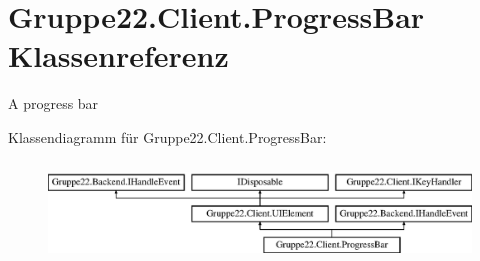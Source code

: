 \hypertarget{class_gruppe22_1_1_client_1_1_progress_bar}{\section{Gruppe22.\-Client.\-Progress\-Bar Klassenreferenz}
\label{class_gruppe22_1_1_client_1_1_progress_bar}
}


A progress bar  


Klassendiagramm für Gruppe22.\-Client.\-Progress\-Bar\-:\begin{figure}[H]
\begin{center}
\leavevmode
\includegraphics[height=2.692308cm]{class_gruppe22_1_1_client_1_1_progress_bar}
\end{center}
\end{figure}
